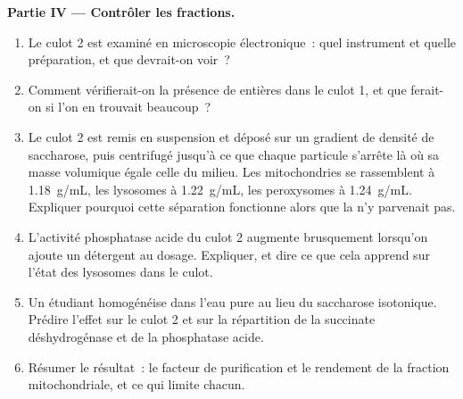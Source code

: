 \begin{problem}
\medskip
\noindent\textbf{Partie IV --- Contrôler les fractions.}
\begin{enumerate}[resume]
  \item Le culot 2 est examiné en microscopie électronique~: quel
        instrument et quelle préparation, et que devrait-on voir~?
  \item Comment vérifierait-on la présence de  entières dans le
        culot 1, et que ferait-on si l'on en trouvait beaucoup~?
  \item Le culot 2 est remis en suspension et déposé sur un gradient de
        densité de saccharose, puis centrifugé jusqu'à ce que chaque
        particule s'arrête là où sa masse volumique égale celle du
        milieu. Les mitochondries se rassemblent à \qty{1.18}{g/mL}, les
        lysosomes à \qty{1.22}{g/mL}, les peroxysomes à
        \qty{1.24}{g/mL}. Expliquer pourquoi cette séparation
        fonctionne alors que la  n'y
        parvenait pas.
  \item L'activité phosphatase acide du culot 2 augmente brusquement
        lorsqu'on ajoute un détergent au dosage. Expliquer, et dire ce
        que cela apprend sur l'état des lysosomes dans le culot.
  \item Un étudiant homogénéise dans l'eau pure au lieu du saccharose
        isotonique. Prédire l'effet sur le culot 2 et sur la
        répartition de la succinate déshydrogénase et de la phosphatase
        acide.
  \item Résumer le résultat~: le facteur de purification et le rendement
        de la fraction mitochondriale, et ce qui limite chacun.
\end{enumerate}
\end{problem}
